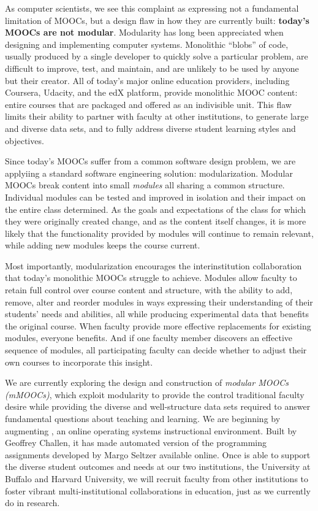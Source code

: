 As computer scientists, we see this complaint as expressing not a fundamental
limitation of MOOCs, but a design flaw in how they are currently built:
\textbf{today's MOOCs are not modular}. Modularity has long been appreciated
when designing and implementing computer systems. Monolithic ``blobs'' of
code, usually produced by a single developer to quickly solve a particular
problem, are difficult to improve, test, and maintain, and are unlikely to be
used by anyone but their creator. All of today's major online education
providers, including Coursera, Udacity, and the edX platform, provide
monolithic MOOC content: entire courses that are packaged and offered as an
indivisible unit. This flaw limits their ability to partner with faculty at
other institutions, to generate large and diverse data sets, and to fully
address diverse student learning styles and objectives.

Since today's MOOCs suffer from a common software design problem, we are
applyiing a standard software engineering solution: modularization. Modular
MOOCs break content into small \textit{modules} all sharing a common
structure. Individual modules can be tested and improved in isolation and
their impact on the entire class determined. As the goals and expectations of
the class for which they were originally created change, and as the content
itself changes, it is more likely that the functionality provided by modules
will continue to remain relevant, while adding new modules keeps the course
current.

Most importantly, modularization encourages the interinstitution
collaboration that today's monolithic MOOCs struggle to achieve. Modules
allow faculty to retain full control over course content and structure, with
the ability to add, remove, alter and reorder modules in ways expressing
their understanding of their students' needs and abilities, all while
producing experimental data that benefits the original course. When faculty
provide more effective replacements for existing modules, everyone benefits.
And if one faculty member discovers an effective sequence of modules, all
participating faculty can decide whether to adjust their own courses to
incorporate this insight.

We are currently exploring the design and construction of \textit{modular
MOOCs (mMOOCs)}, which exploit modularity to provide the control traditional
faculty desire while providing the diverse and well-structure data sets
required to answer fundamental questions about teaching and learning. We are
beginning by augmenting \opsclass{}, an online operating systems
instructional environment. Built by Geoffrey Challen, it has made automated
version of the programming assignments developed by Margo Seltzer available
online. Once \opsclass{} is able to support the diverse student outcomes and
needs at our two institutions, the University at Buffalo and Harvard
University, we will recruit faculty from other institutions to foster vibrant
multi-institutional collaborations in education, just as we currently do in
research.


